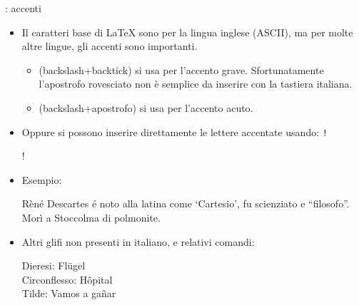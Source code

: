 \documentclass{beamer}
\begin{document}
\begin{frame}[fragile]{\insertsubsection{}: accenti}
\small
\begin{itemize}
\item Il caratteri base di \LaTeX{} sono per la lingua inglese (ASCII), ma per molte altre lingue, gli accenti sono importanti.
\begin{itemize}
\item {} (backslash+backtick) si usa per l'accento grave. Sfortunatamente l'apostrofo rovesciato non \`e semplice da inserire con la tastiera italiana.
\item {} (backslash+apostrofo) si usa per l'accento acuto.
\end{itemize}
\item Oppure si possono inserire direttamente le lettere accentate usando:
\texttt!\usepackage[latin1]{inputenc}!
\item Esempio:
\begin{exampletwouptiny}
R\`{e}n\'{e} Descartes \'{e} noto
alla latina come `Cartesio', 
fu scienziato e ``filosofo''.
Mor\`{i} a Stoccolma di polmonite.
\end{exampletwouptiny}

\item Altri glifi non presenti in italiano, e relativi comandi:
\begin{exampletwouptiny}
Dieresi: Fl\"ugel\\
Circonflesso: H\^opital\\
Tilde: Vamos a ga\~nar\\
\end{exampletwouptiny}
\end{itemize}
\end{frame}
\end{document}
